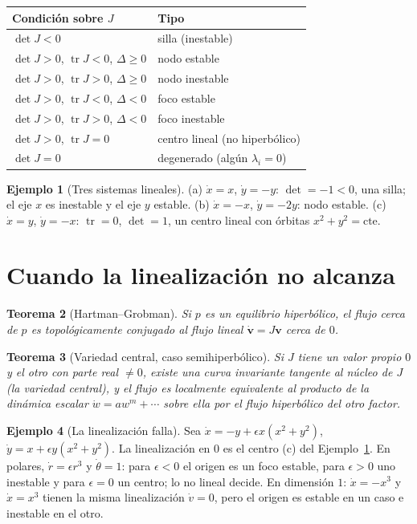 \documentclass[11pt,a4paper,oneside]{book}
\newcommand{\tr}{\operatorname{tr}}
\theoremstyle{plain}
\newtheorem{teorema}{Teorema}[chapter]
\theoremstyle{definition}
\newtheorem{ejemplo}[teorema]{Ejemplo}
\theoremstyle{remark}
\begin{document}
\begin{center}
\begin{tabular}{@{}ll@{}}
\toprule
Condición sobre $J$ & Tipo \\
\midrule
$\det J<0$ & silla (inestable) \\
$\det J>0$, $\tr J<0$, $\Delta\ge0$ & nodo estable \\
$\det J>0$, $\tr J>0$, $\Delta\ge0$ & nodo inestable \\
$\det J>0$, $\tr J<0$, $\Delta<0$ & foco estable \\
$\det J>0$, $\tr J>0$, $\Delta<0$ & foco inestable \\
$\det J>0$, $\tr J=0$ & centro lineal (no hiperbólico) \\
$\det J=0$ & degenerado (algún $\lambda_i=0$) \\
\bottomrule
\end{tabular}
\end{center}

\begin{ejemplo}[Tres sistemas lineales]\label{ej:lineales}
(a) $\dot x=x$, $\dot y=-y$: $\det=-1<0$, una silla; el eje $x$ es inestable y el eje $y$ estable. (b) $\dot x=-x$, $\dot y=-2y$: nodo estable. (c) $\dot x=y$, $\dot y=-x$: $\tr=0$, $\det=1$, un centro lineal con órbitas $x^2+y^2=\text{cte}$.
\end{ejemplo}

\section{Cuando la linealización no alcanza}

\begin{teorema}[Hartman--Grobman]
Si $p$ es un equilibrio hiperbólico, el flujo cerca de $p$ es topológicamente conjugado al flujo lineal $\dot{\mathbf v}=J\mathbf v$ cerca de $0$.
\end{teorema}

\begin{teorema}[Variedad central, caso semihiperbólico]
Si $J$ tiene un valor propio $0$ y el otro con parte real $\ne0$, existe una curva invariante tangente al núcleo de $J$ (la variedad central), y el flujo es localmente equivalente al producto de la dinámica escalar $\dot w=aw^m+\cdots$ sobre ella por el flujo hiperbólico del otro factor.
\end{teorema}

\begin{ejemplo}[La linealización falla]\label{ej:polar}
Sea $\dot x=-y+\epsilon x(x^2+y^2)$, $\dot y=x+\epsilon y(x^2+y^2)$. La linealización en $0$ es el centro (c) del Ejemplo~\ref{ej:lineales}. En polares, $\dot r=\epsilon r^3$ y $\dot\theta=1$: para $\epsilon<0$ el origen es un foco estable, para $\epsilon>0$ uno inestable y para $\epsilon=0$ un centro; lo no lineal decide. En dimensión $1$: $\dot x=-x^3$ y $\dot x=x^3$ tienen la misma linealización $\dot v=0$, pero el origen es estable en un caso e inestable en el otro.
\end{ejemplo}
\end{document}
